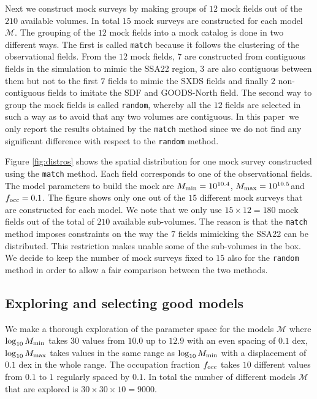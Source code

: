 \documentclass{emulateapj}
\newcommand{\documentname}{paper~}
\newcommand{\hMsun}{{\ifmmode{h^{-1}{\rm
        {M_{\odot}}}}\else{$h^{-1}{\rm{M_{\odot}}}$}\fi}}
\begin{document}
Next we construct mock surveys by making groups of $12$ mock fields
out of the $210$ available volumes. In total $15$ mock surveys are
constructed for each model $\mathcal{M}$. The grouping of the $12$
mock fields into a mock catalog is done in two different ways. The
first is called {\texttt{match}} because it follows the clustering of the
observational fields. From the $12$ mock fields, $7$ are constructed
from contiguous fields in the simulation to mimic the SSA22 region,
$3$ are also contiguous between them but not to the first $7$ fields
to mimic the SXDS fields and finally $2$ non-contiguous fields to
imitate the SDF and GOODS-North field.   The second way to group the
mock fields is called {\texttt{random}}, whereby all the $12$ fields
are selected in such a way as to avoid that any two volumes are
contiguous. In this \documentname we only report the results obtained
by the {\texttt{match}} method since we do not find any significant
difference with respect to the {\texttt{random}} method.


Figure \ref{fig:distros} shows the spatial distribution for one mock
survey constructed using the {\texttt{match}} method. Each field
corresponds to one of the observational fields. The model parameters
to build the mock are $M_{\rm min}=10^{10.4}$\hMsun, $M_{\rm
  max}=10^{10.5}$\hMsun and $f_{\rm occ}=0.1$. The figure shows only
one out of the $15$ different mock surveys that are constructed for
each model. We note that we only use $15\times 12=180$ mock fields out of the
total of $210$ available sub-volumes. The reason is that the {\texttt{match}}
method imposes constraints on the way the $7$ fields mimicking the
SSA22 can be distributed. This restriction makes unable some of the
sub-volumes in the box. We decide to keep the number of mock surveys
fixed to $15$ also for the {\texttt{random}} method in order to allow a
fair comparison between the two methods.

\subsection{Exploring and selecting good models}

We make a thorough exploration of the parameter space for the models
${\mathcal M}$ where $\log_{10} M_{\rm min}$ takes $30$ values from $10.0$ up
to $12.9$ with an even spacing of $0.1$ dex, $\log_{10} M_{\rm max}$
takes values in the same range as $\log_{10}M_{\rm min}$ with a
displacement of $0.1$ dex in the whole range. The occupation fraction
$f_{\rm occ}$ takes $10$ different values from $0.1$ to $1$ regularly
spaced by $0.1$. In total the number of different models ${\mathcal
  M}$ that are explored is $30 \times 30 \times 10 = 9000$.  
\end{document}
